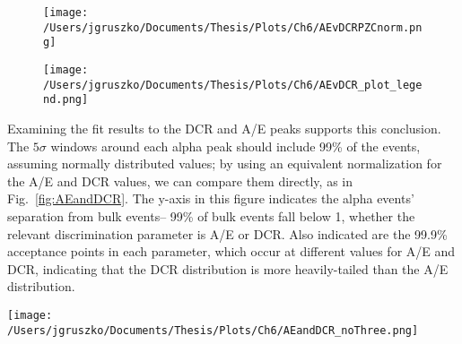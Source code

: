 \begin{figure*}[]
 \centering
 \begin{subfigure}{.65\textwidth}
 \texttt{[image: /Users/jgruszko/Documents/Thesis/Plots/Ch6/AEvDCRPZCnorm.png]}
 \end{subfigure}
 \begin{subfigure}{.34\textwidth}
  \texttt{[image: /Users/jgruszko/Documents/Thesis/Plots/Ch6/AEvDCR\_plot\_legend.png]}
   \end{subfigure}
 \caption[The A/E vs. normalized DCR distribution at various scanning radii]{The A/E vs. normalized DCR distribution for all single-site events with energies between 100\,keV and 10\,MeV, at various scanning radii. The points in black are from a data set without the alpha source incident on the detector surface, and the scan data sets are shown in rainbow order, with red representing the smallest-radius scan. 99\% of calibration events with energies between 1000 and 2630\,keV fall below an A/E value of 1, and 99\% of calibration events with energies between 1000 and 2380\,keV fall below a {\tt dcrpzc99norm} value of 1.} 
 \label{fig:AEvDCR_events}
\end{figure*}

Examining the fit results to the DCR and A/E peaks supports this conclusion. The $5\sigma$ windows around each alpha peak should include 99\% of the events, assuming normally distributed values; by using an equivalent normalization for the A/E and DCR values, we can compare them directly, as in Fig.~\ref{fig:AEandDCR}. The y-axis in this figure indicates the alpha events' separation from bulk events-- 99\% of bulk events fall below 1, whether the relevant discrimination parameter is A/E or DCR. Also indicated are the 99.9\% acceptance points in each parameter, which occur at different values for A/E and DCR, indicating that the DCR distribution is more heavily-tailed than the A/E distribution. 

\begin{figure*}[]
 \centering
 \texttt{[image: /Users/jgruszko/Documents/Thesis/Plots/Ch6/AEandDCR\_noThree.png]}
 \caption[A plot of A/E and DCR alpha peak positions, showing the complementarity of the pulse shape discriminators]{The $5\sigma$ window containing the A/E and DCR alpha peak positions at each position, normalized to 99\% bulk acceptance of both cuts. The red points and magenta boxes indicate the centroids and $\pm 2.5\sigma$ values of the peaks in {\tt dcrpzc99norm}, and the green points and blue boxes indicate the same in {\tt aenorm}. The red dotted line and cyan dotted-dashed line are the 99.9\% acceptance points in DCR and A/E, respectively. The black dashed line indicates the 99\% acceptance point in both parameters.} 
 \label{fig:AEandDCR}
\end{figure*}

